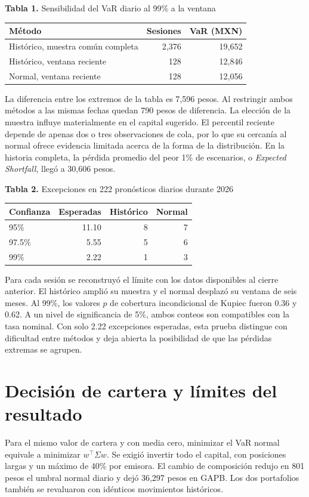 \documentclass[11pt,letterpaper]{article}
\begin{document}
\begin{center}
\textbf{Tabla 1.} Sensibilidad del VaR diario al 99\% a la ventana\\[5pt]
\begin{tabular}{lrr}\toprule
Método & Sesiones & VaR (MXN)\\ \midrule
Histórico, muestra común completa & 2,376 & 19,652\\
Histórico, ventana reciente & 128 & 12,846\\
Normal, ventana reciente & 128 & 12,056\\ \bottomrule
\end{tabular}
\end{center}
La diferencia entre los extremos de la tabla es 7,596 pesos. Al restringir ambos métodos a las mismas fechas quedan 790 pesos de diferencia. La elección de la muestra influye materialmente en el capital sugerido. El percentil reciente depende de apenas dos o tres observaciones de cola, por lo que su cercanía al normal ofrece evidencia limitada acerca de la forma de la distribución. En la historia completa, la pérdida promedio del peor 1\% de escenarios, o \textit{Expected Shortfall}, llegó a 30,606 pesos.

\begin{center}
\textbf{Tabla 2.} Excepciones en 222 pronósticos diarios durante 2026\\[5pt]
\begin{tabular}{lrrr}\toprule
Confianza & Esperadas & Histórico & Normal\\ \midrule
95\% & 11.10 & 8 & 7\\
97.5\% & 5.55 & 5 & 6\\
99\% & 2.22 & 1 & 3\\ \bottomrule
\end{tabular}
\end{center}
Para cada sesión se reconstruyó el límite con los datos disponibles al cierre anterior. El histórico amplió su muestra y el normal desplazó su ventana de seis meses. Al 99\%, los valores $p$ de cobertura incondicional de Kupiec \cite{kupiec} fueron 0.36 y 0.62. A un nivel de significancia de 5\%, ambos conteos son compatibles con la tasa nominal. Con solo 2.22 excepciones esperadas, esta prueba distingue con dificultad entre métodos y deja abierta la posibilidad de que las pérdidas extremas se agrupen.

\newpage
\section{Decisión de cartera y límites del resultado}
Para el mismo valor de cartera y con media cero, minimizar el VaR normal equivale a minimizar $w^\top\Sigma w$. Se exigió invertir todo el capital, con posiciones largas y un máximo de 40\% por emisora. El cambio de composición redujo en 801 pesos el umbral normal diario y dejó 36,297 pesos en GAPB. Los dos portafolios también se revaluaron con idénticos movimientos históricos.
\end{document}
